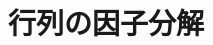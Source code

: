 \documentclass[../../topic_linear-algebra]{subfiles}
\begin{document}
\chapter{行列の因子分解}
\end{document}
